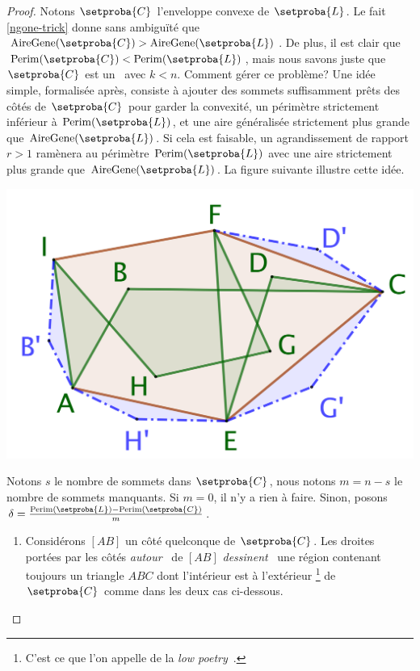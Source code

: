 \begin{proof}
	Notons $\setproba{C}$ l'enveloppe convexe de $\setproba{L}$. Le fait \ref{ngone-trick} donne sans ambiguïté que $\garea{\setproba{C}} > \garea{\setproba{L}}$. De plus, il est clair que $\perim{\setproba{C}} < \perim{\setproba{L}}$, mais nous savons juste que $\setproba{C}$ est un \kgone\ avec $k < n$. 
	Comment gérer ce problème?
	Une idée simple, formalisée après, consiste à ajouter des sommets suffisamment prêts des côtés de $\setproba{C}$ pour garder la convexité, un périmètre strictement inférieur à $\perim{\setproba{L}}$, et une aire généralisée strictement plus grande que $\garea{\setproba{L}}$. Si cela est faisable, un agrandissement de rapport $r > 1$ ramènera au périmètre $\perim{\setproba{L}}$ avec une aire strictement plus grande que $\garea{\setproba{L}}$.
	La figure suivante illustre cette idée.

	\begin{center}
		\includegraphics[scale=.4]{content/polygon/at-least-one/convex-hull-distortion.png}
	\end{center}


	Notons $s$ le nombre de sommets dans $\setproba{C}$, nous notons $m = n - s$ le nombre de sommets manquants.
	Si $m = 0$, il n'y a rien à faire.
	Sinon, posons $\delta = \frac{\perim{\setproba{L}} - \perim{\setproba{C}}}{m}$.
	\begin{enumerate}
		\item \label{add-vertex-start}
		Considérons $[AB]$ un côté quelconque de $\setproba{C}$.
		Les droites portées par les côtés \og \emph{autour} \fg\ de $[AB]$ \og \emph{dessinent} \fg\ une région contenant toujours un triangle $ABC$ dont l'intérieur est à l'extérieur
		\footnote{
			C'est ce que l'on appelle de la \og \emph{low poetry} \fg\,.
		}
		de $\setproba{C}$ comme dans les deux cas ci-dessous.
		\begin{multicols}{2}
			\centering


\end{multicols}
\end{enumerate}
\end{proof}
